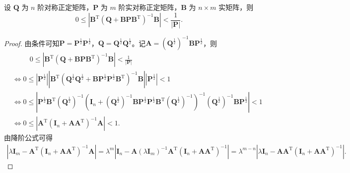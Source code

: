 \documentclass[../../main.tex]{subfiles}
\begin{document}
\begin{example}\label{example:例题9.3112223444}
设 $\boldsymbol{Q}$ 为 $n$ 阶对称正定矩阵，$\boldsymbol{P}$ 为 $m$ 阶实对称正定矩阵，$\boldsymbol{B}$ 为 $n \times m$ 实矩阵，则
$$0 \leqslant |\boldsymbol{B}^{\mathrm{T}}(\boldsymbol{Q} + \boldsymbol{B}\boldsymbol{P}\boldsymbol{B}^{\mathrm{T}})^{-1}\boldsymbol{B}| < \frac{1}{|\boldsymbol{P}|}.$$
\end{example}
\begin{proof}
由条件可知$\boldsymbol{P} = \boldsymbol{P}^{\frac{1}{2}}\boldsymbol{P}^{\frac{1}{2}}$，$\boldsymbol{Q} = \boldsymbol{Q}^{\frac{1}{2}}\boldsymbol{Q}^{\frac{1}{2}}$。记$\boldsymbol{A} = \left( \boldsymbol{Q}^{\frac{1}{2}} \right)^{-1}\boldsymbol{B}\boldsymbol{P}^{\frac{1}{2}}$，则
\begin{align*}
&\qquad\,\,\, 0 \leqslant |\boldsymbol{B}^{\mathrm{T}}(\boldsymbol{Q} + \boldsymbol{B}\boldsymbol{P}\boldsymbol{B}^{\mathrm{T}})^{-1}\boldsymbol{B}| < \frac{1}{|\boldsymbol{P}|}
\\
&\Longleftrightarrow 0 \leqslant \left| \boldsymbol{P}^{\frac{1}{2}} \right| \left| \boldsymbol{B}^{\mathrm{T}} \left( \boldsymbol{Q}^{\frac{1}{2}}\boldsymbol{Q}^{\frac{1}{2}} + \boldsymbol{B}\boldsymbol{P}^{\frac{1}{2}}\boldsymbol{P}^{\frac{1}{2}}\boldsymbol{B}^{\mathrm{T}} \right)^{-1}\boldsymbol{B} \right| \left| \boldsymbol{P}^{\frac{1}{2}} \right| < 1 \\
&\Longleftrightarrow 0 \leqslant \left| \boldsymbol{P}^{\frac{1}{2}}\boldsymbol{B}^{\mathrm{T}} \left( \boldsymbol{Q}^{\frac{1}{2}} \right)^{-1} \left( \boldsymbol{I}_n + \left( \boldsymbol{Q}^{\frac{1}{2}} \right)^{-1}\boldsymbol{B}\boldsymbol{P}^{\frac{1}{2}}\boldsymbol{P}^{\frac{1}{2}}\boldsymbol{B}^{\mathrm{T}} \left( \boldsymbol{Q}^{\frac{1}{2}} \right)^{-1} \right)^{-1} \left( \boldsymbol{Q}^{\frac{1}{2}} \right)^{-1}\boldsymbol{B}\boldsymbol{P}^{\frac{1}{2}} \right| < 1 \\
&\Longleftrightarrow 0 \leqslant \left| \boldsymbol{A}^{\mathrm{T}}(\boldsymbol{I}_n + \boldsymbol{A}\boldsymbol{A}^{\mathrm{T}})^{-1}\boldsymbol{A} \right| < 1.
\end{align*}
由降阶公式可得
\begin{align*}
\left| \lambda \boldsymbol{I}_m - \boldsymbol{A}^{\mathrm{T}} \left( \boldsymbol{I}_n + \boldsymbol{A}\boldsymbol{A}^{\mathrm{T}} \right)^{-1}\boldsymbol{A} \right| = \lambda^m \left| \boldsymbol{I}_n - \boldsymbol{A} \left( \lambda \boldsymbol{I}_m \right)^{-1}\boldsymbol{A}^{\mathrm{T}} \left( \boldsymbol{I}_n + \boldsymbol{A}\boldsymbol{A}^{\mathrm{T}} \right)^{-1} \right| = \lambda^{m-n} \left| \lambda \boldsymbol{I}_n - \boldsymbol{A}\boldsymbol{A}^{\mathrm{T}} \left( \boldsymbol{I}_n + \boldsymbol{A}\boldsymbol{A}^{\mathrm{T}} \right)^{-1} \right|.

\end{align*}
\end{proof}
\end{document}
